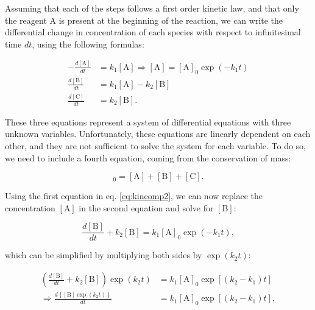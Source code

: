 \documentclass[
  9pt,
]{extbook}
\theoremstyle{definition}
\theoremstyle{definition}
\theoremstyle{definition}
\theoremstyle{remark}
\begin{document}
Assuming that each of the steps follows a first order kinetic law, and that only the reagent \(\mathrm{A}\) is present at the beginning of the reaction, we can write the differential change in concentration of each species with respect to infinitesimal time \(dt\), using the following formulas:

\begin{equation}
\begin{aligned}
-\frac{d[\mathrm{A}]}{dt}&=k_1 [\mathrm{A}] \Rightarrow [\mathrm{A}] = [\mathrm{A}]_0 \exp(-k_1 t) \\
\frac{d[\mathrm{B}]}{dt} &=k_1 [\mathrm{A}]-k_2 [\mathrm{B}] \\
\frac{d[\mathrm{C}]}{dt} &=k_2 [\mathrm{B}].
\end{aligned}
\label{eq:kincomp2}
\end{equation}

These three equations represent a system of differential equations with three unknown variables. Unfortunately, these equations are linearly dependent on each other, and they are not sufficient to solve the system for each variable. To do so, we need to include a fourth equation, coming from the conservation of mass:

\begin{equation}
[\mathrm{A}]_0=[\mathrm{A}]+[\mathrm{B}]+[\mathrm{C}].
\label{eq:kincomp3}
\end{equation}

Using the first equation in eq. \eqref{eq:kincomp2}, we can now replace the concentration \([\mathrm{A}]\) in the second equation and solve for \([\mathrm{B}]\):

\begin{equation}
\frac{d[\mathrm{B}]}{dt}+k_2 [\mathrm{B}]=k_1 [\mathrm{A}]_0 \exp(-k_1 t),
\label{eq:kincomp4}
\end{equation}

which can be simplified by multiplying both sides by \(\exp (k_2t)\):

\begin{equation}
\begin{aligned}
\left( \frac{d[\mathrm{B}]}{dt}+k_2 [\mathrm{B}] \right) \exp (k_2t) &= k_1 [\mathrm{A}]_0 \exp[(k_2-k_1) t] \\
\Rightarrow \frac{d\left\{[\mathrm{B}]\exp (k_2t)\right\}}{dt} &= k_1 [\mathrm{A}]_0 \exp[(k_2-k_1) t],
\end{aligned}
\label{eq:kincomp5}
\end{equation}
\end{document}
